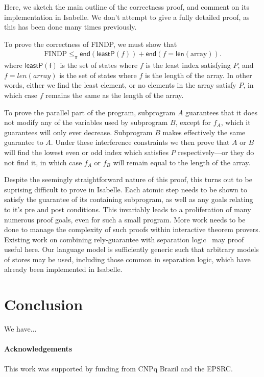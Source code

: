 \documentclass{llncs}
\newcommand{\edn}{\mathsf{end}}
\begin{document}
Here, we sketch the main outline of the correctness proof, and comment
on its implementation in Isabelle. We don't attempt to give a fully
detailed proof, as this has been done many times previously.

To prove the correctness of FINDP, we must show that
\begin{align*}
\text{FINDP} \le_\pi \edn(\mathsf{leastP}(f)) + \edn(f = \mathsf{len}(\text{array})).
\end{align*}
where $\mathsf{leastP(f)}$ is the set of states where $f$ is the least
index satisfying $P$, and $f = len(array)$ is the set of states where
$f$ is the length of the array. In other words, either we find the
least element, or no elements in the array satisfy $P$, in which case
$f$ remains the same as the length of the array.

To prove the parallel part of the program, subprogram $A$ guarantees
that it does not modify any of the variables used by subprogram $B$,
except for $f_A$, which it guarantees will only ever
decrease. Subprogram $B$ makes effectively the same guarantee to
$A$. Under these interference constraints we then prove that $A$ or
$B$ will find the lowest even or odd index which satisfies $P$
respectively---or they do not find it, in which case $f_A$ or $f_B$
will remain equal to the length of the array.

Despite the seemingly straightforward nature of this proof, this turns
out to be suprising difficult to prove in Isabelle. Each atomic step
needs to be shown to satisfy the guarantee of its containing
subprogram, as well as any goals relating to it's pre and post
conditions. This invariably leads to a proliferation of many numerous
proof goals, even for such a small program. More work needs to be done
to manage the complexity of such proofs within interactive theorem
provers. Existing work on combining rely-guarantee with separation
logic~\cite{vafeiadis_modular_2008} may proof useful here. Our language model is
sufficiently generic such that arbitrary models of stores may be used,
including those common in separation logic, which have already been
implemented in Isabelle.

\section{Conclusion}

We have...

\paragraph*{Acknowledgements} This work was supported by funding from
CNPq Brazil and the EPSRC.

\newpage

{}

\end{document}
